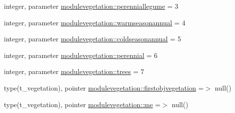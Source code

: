 \begin{DoxyCompactItemize}
\item 
integer, parameter \mbox{\hyperlink{namespacemodulevegetation_a2358703148df12cce73e5316f9194016}{modulevegetation\+::perenniallegume}} = 3
\item 
integer, parameter \mbox{\hyperlink{namespacemodulevegetation_a110f4ca571607af92386764b0832fd96}{modulevegetation\+::warmseasonannual}} = 4
\item 
integer, parameter \mbox{\hyperlink{namespacemodulevegetation_a2d67e3996b3eaec3ed46783d415ca576}{modulevegetation\+::coldseasonannual}} = 5
\item 
integer, parameter \mbox{\hyperlink{namespacemodulevegetation_a96d9120624d107226156e706840efa11}{modulevegetation\+::perennial}} = 6
\item 
integer, parameter \mbox{\hyperlink{namespacemodulevegetation_ad076c54f9b499254f3f80779270921a4}{modulevegetation\+::trees}} = 7
\item 
type(t\+\_\+vegetation), pointer \mbox{\hyperlink{namespacemodulevegetation_aa55dc95d88d1f697796037ffc7ed34ae}{modulevegetation\+::firstobjvegetation}} =$>$ null()
\item 
type(t\+\_\+vegetation), pointer \mbox{\hyperlink{namespacemodulevegetation_aeef5a5f66defced3e5aa3faa8fbed9ed}{modulevegetation\+::me}} =$>$ null()
\end{DoxyCompactItemize}
